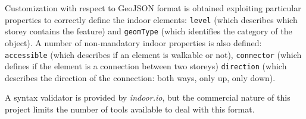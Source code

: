 Customization with respect to GeoJSON format is obtained exploiting particular properties to correctly define the indoor elements: \texttt{level} (which describes which storey contains the feature) and \texttt{geomType} (which identifies the category of the object). A number of non-mandatory indoor properties is also defined: \texttt{accessible} (which describes if an element is walkable or not), \texttt{connector} (which defines if the element is a connection between two
 storeys) \texttt{direction} (which describes the direction of the connection: both
 ways, only up, only down).

A syntax validator is provided by \emph{indoor.io}, but the commercial nature
of this project limits the number of tools available to deal with this
format.
